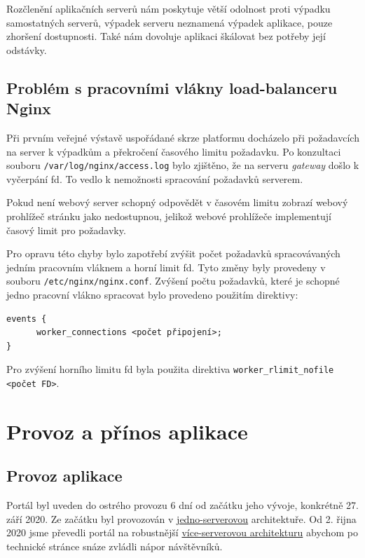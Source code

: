 Rozčlenění aplikačních serverů nám poskytuje větší odolnost proti výpadku samostatných serverů, výpadek serveru neznamená výpadek aplikace, pouze zhoršení dostupnosti.
Také nám dovoluje aplikaci škálovat bez potřeby její odstávky.

\subsection{Problém s pracovními vlákny load-balanceru Nginx}\label{sub:poor-nginx}

Při prvním veřejné výstavě uspořádané skrze platformu \bso{} docházelo při požadavcích na server k výpadkům a překročení časového limitu požadavku.
Po konzultaci souboru \verb|/var/log/nginx/access.log| bylo zjištěno, že na serveru \textit{gateway} došlo k vyčerpání \acrshort{fd}.
To vedlo k nemožnosti spracování požadavků serverem.

Pokud není webový server schopný odpovědět v časovém limitu zobrazí webový prohlížeč stránku jako nedostupnou,
jelikož webové prohlížeče implementují časový limit pro požadavky\cite{browser-timeout}.

Pro opravu této chyby bylo zapotřebí zvýšit počet požadavků spracovávaných jedním pracovním vláknem a horní limit \acrshort{fd}.
Tyto změny byly provedeny v souboru \verb|/etc/nginx/nginx.conf|.
\pagebreak
Zvýšení počtu požadavků, které je schopné jedno pracovní vlákno spracovat bylo provedeno použitím direktivy:
\begin{verbatim}
events {
      worker_connections <počet připojení>;
}
\end{verbatim}
Pro zvýšení horního limitu \acrshort{fd} byla použita direktiva \verb|worker_rlimit_nofile <počet FD>|.

\section{Provoz a přínos aplikace}

\subsection{Provoz aplikace}

Portál byl uveden do ostrého provozu 6 dní od začátku jeho vývoje, konkrétně 27. září 2020.
Ze začátku byl provozován v \hyperref[sub:one-server]{jedno-serverovou} architektuře.
Od 2. řijna 2020 jsme převedli portál na robustnější \hyperref[sub:multi-server]{více-serverovou architekturu}
abychom po technické stránce snáze zvládli nápor návštěvníků. 

